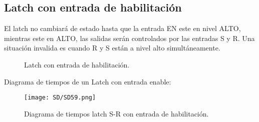 \documentclass[11pt,fleqn]{book} %
\begin{document}
\subsection{Latch con entrada de habilitación}
El latch no cambiará de estado hasta que la entrada EN este en nivel ALTO, mientras este en ALTO, las salidas serán controlados por las entradas S y R. Una situación invalida es cuando R y S están a nivel alto simultáneamente.
\begin{figure}[h]
    \centering
    \qquad
    \caption{Latch con entrada de habilitación.}
\end{figure}
Diagrama de tiempos de un Latch con entrada enable:
\begin{figure}[h!]
\centering
\texttt{[image: SD/SD59.png]}
\caption{Diagrama de tiempos latch S-R con entrada de habilitación.}
\end{figure}
\end{document}
